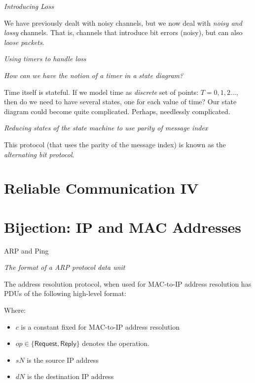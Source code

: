 \textit{Introducing Loss}

We have previously dealt with noisy channels, 
but we now deal with \textit{noisy and lossy} channels. 
That is, channels that introduce bit errors (noisy), but can 
also \textit{loose packets}.


\frmrule 

\textit{Using timers to handle loss}



\frmrule 

\textit{How can we have the notion of a timer in a state diagram?}

Time itself is stateful. If we model time as \textit{discrete} set of points: 
$T= 0,1,2...$, then do we need to have several states, one for each value of time?
Our state diagram could become quite complicated. Perhaps, needlessly complicated.

\frmrule 

\textit{Reducing states of the state machine to use parity of message index}


This protocol (that uses the parity of the message index) 
is known as the \textit{alternating bit protocol}.


\section{Reliable Communication IV}



\section{Bijection: IP and MAC Addresses}

ARP and Ping

\frmrule 

\textit{The format of a ARP protocol data unit}

The address resolution protocol, when used for 
MAC-to-IP address resolution has PDUs of the following high-level format: 

Where:
\begin{itemize}
\item $c$ is a constant fixed for MAC-to-IP address resolution
\item $op \in \{\textsf{Request}, \textsf{Reply} \}$ denotes 
the operation.
\item $sN$ is the source IP address 
\item $dN$ is the destination IP address
\end{itemize}

